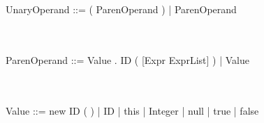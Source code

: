 \documentclass[a4paper,portrait,12pt]{article}
\begin{document}
\\~\\
UnaryOperand ::=	( ParenOperand ) 		\newline
\hspace*{.625in} | ParenOperand

\\~\\
ParenOperand ::=	Value . ID ( [Expr ExprList] )	\newline
\hspace*{.625in} | Value

\\~\\
Value ::=	new ID ( )						\newline
\hspace*{.625in} | ID						\newline
\hspace*{.625in} | this   					\newline
\hspace*{.625in} | Integer					\newline
\hspace*{.625in} | null   					\newline
\hspace*{.625in} | true   					\newline
\hspace*{.625in} | false  					\newline
\end{document}
